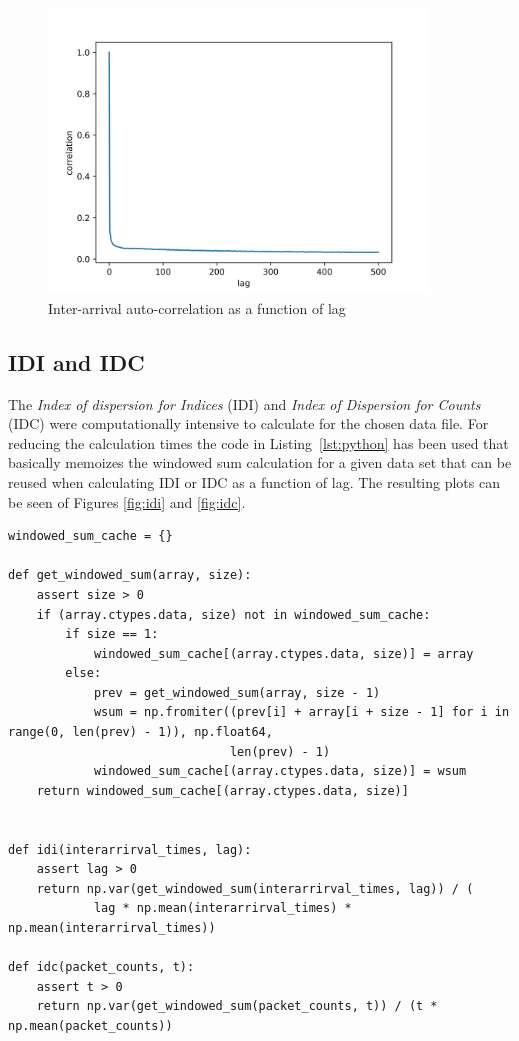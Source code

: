 \documentclass[a4paper]{article}
\begin{document}
\begin{figure}[H]
    \centering
    \includegraphics[width=0.9\textwidth]{figures/interarrival_correlation.png}
    \caption{Inter-arrival auto-correlation as a function of lag}
    \label{fig:interarrcorr}
\end{figure}

\subsection{IDI and IDC}

The \emph{Index of dispersion for Indices} (IDI) and \emph{Index of Dispersion for Counts} (IDC) were computationally intensive to calculate for the chosen data file.
For reducing the calculation times the code in Listing~\ref{lst:python} has been used that basically memoizes the windowed sum 
calculation for a given data set that can be reused when calculating IDI or IDC as a function of lag. The resulting plots can be seen of Figures \ref{fig:idi} and \ref{fig:idc}.

\begin{lstlisting}[style=mypython,caption={The functions used for calculating IDI and IDC},label={lst:python}]
windowed_sum_cache = {}

def get_windowed_sum(array, size):
    assert size > 0
    if (array.ctypes.data, size) not in windowed_sum_cache:
        if size == 1:
            windowed_sum_cache[(array.ctypes.data, size)] = array
        else:
            prev = get_windowed_sum(array, size - 1)
            wsum = np.fromiter((prev[i] + array[i + size - 1] for i in range(0, len(prev) - 1)), np.float64,
                               len(prev) - 1)
            windowed_sum_cache[(array.ctypes.data, size)] = wsum
    return windowed_sum_cache[(array.ctypes.data, size)]


def idi(interarrirval_times, lag):
    assert lag > 0
    return np.var(get_windowed_sum(interarrirval_times, lag)) / (
            lag * np.mean(interarrirval_times) * np.mean(interarrirval_times))

def idc(packet_counts, t):
    assert t > 0
    return np.var(get_windowed_sum(packet_counts, t)) / (t * np.mean(packet_counts))
\end{lstlisting}
\end{document}
